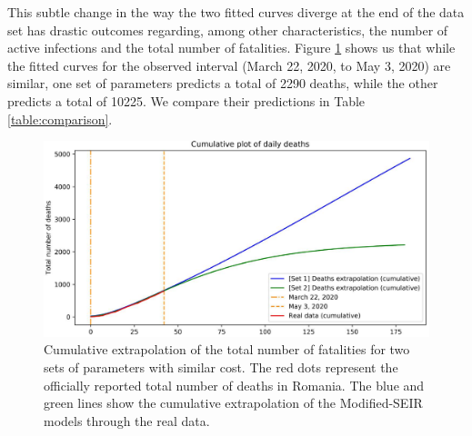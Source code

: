 \documentclass[11pt]{article}
\begin{document}
This subtle change in the way the two fitted curves diverge at the end of the data set has drastic outcomes regarding, among other characteristics, the number of active infections and the total number of fatalities. Figure \ref{fig:compare-cumulative-deaths} shows us that while the fitted curves for the observed interval (March 22, 2020, to May 3, 2020) are similar, one set of parameters predicts a total of 2290 deaths, while the other predicts a total of 10225. We compare their predictions in Table \ref{table:comparison}.

\begin{figure}[H]
  \centering
  \includegraphics[width=0.8\linewidth]{figs/comparison/05-03-cumulative_deaths_extrapolation.pdf}
  \caption{Cumulative extrapolation of the total number of fatalities for two sets of parameters with similar cost. The red dots represent the officially reported total number of deaths in Romania. The blue and green lines show the cumulative extrapolation of the Modified-SEIR models through the real data.}
  \label{fig:compare-cumulative-deaths}
\end{figure}
\end{document}
